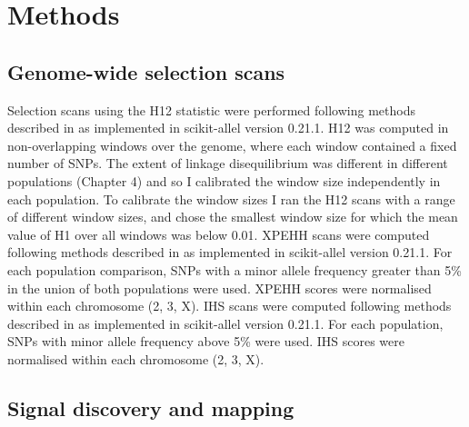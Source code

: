 \documentclass[a4paper,11pt,abstracton,hidelinks]{scrartcl}
\begin{document}
\section{Methods}\label{sec:methods}


\subsection{Genome-wide selection scans}\label{subsec:methods-gwss}


Selection scans using the H12 statistic were performed following methods described in \textcite{Garud2015} as implemented in scikit-allel version 0.21.1.
%
H12 was computed in non-overlapping windows over the genome, where each window contained a fixed number of SNPs.
%
The extent of linkage disequilibrium was different in different populations (Chapter 4) and so I calibrated the window size independently in each population.
%
To calibrate the window sizes I ran the H12 scans with a range of different window sizes, and chose the smallest window size for which the mean value of H1 over all windows was below 0.01.
%
XPEHH scans were computed following methods described in \textcite{Sabeti2007} as implemented in scikit-allel version 0.21.1.
%
For each population comparison, SNPs with a minor allele frequency greater than 5\% in the union of both populations were used.
%
XPEHH scores were normalised within each chromosome (2, 3, X).
%
IHS scans were computed following methods described in \textcite{Voight2006} as implemented in scikit-allel version 0.21.1.
%
For each population, SNPs with minor allele frequency above 5\% were used.
%
IHS scores were normalised within each chromosome (2, 3, X).


\subsection{Signal discovery and mapping}\label{subsec:methods-discovery}
\end{document}
